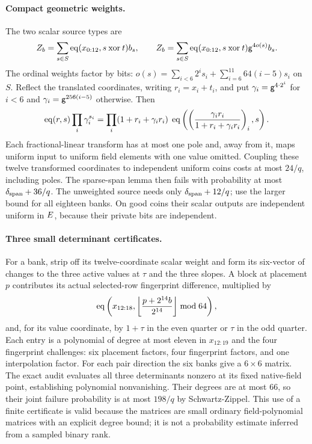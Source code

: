 \paragraph{Compact geometric weights.} The two scalar source types are
\[
 Z_b=\sum_{s\in S}\operatorname{eq}(x_{0:12},s\mathbin{\mathrm{xor}}t)b_s,
 \qquad
 Z_b=\sum_{s\in S}\operatorname{eq}(x_{0:12},s\mathbin{\mathrm{xor}}t)
                    \mathsf{g}^{4o(s)}b_s.
\]
The ordinal weights factor by bits: $o(s)=\sum_{i<6}2^is_i+\sum_{i=6}^{11}64(i-5)s_i$ on $S$. Reflect the translated coordinates, writing $r_i=x_i+t_i$, and put $\gamma_i=\mathsf{g}^{4\cdot2^i}$ for $i<6$ and $\gamma_i=\mathsf{g}^{256(i-5)}$ otherwise. Then
\[
 \operatorname{eq}(r,s)\prod_i\gamma_i^{s_i}
 =\prod_i(1+r_i+\gamma_i r_i)\;
   \operatorname{eq}\left(\left(\frac{\gamma_i r_i}{1+r_i+\gamma_i r_i}\right)_i,s\right).
\]
Each fractional-linear transform has at most one pole and, away from it, maps uniform input to uniform field elements with one value omitted. Coupling these twelve transformed coordinates to independent uniform coins costs at most $24/q$, including poles. The sparse-span lemma then fails with probability at most $\delta_{\rm span}+36/q$. The unweighted source needs only $\delta_{\rm span}+12/q$; use the larger bound for all eighteen banks. On good coins their scalar outputs are independent uniform in $E$, because their private bits are independent.

\paragraph{Three small determinant certificates.} For a bank, strip off its twelve-coordinate scalar weight and form its six-vector of changes to the three active values at $\tau$ and the three slopes. A block at placement $p$ contributes its actual selected-row fingerprint difference, multiplied by
\[
 \operatorname{eq}\left(x_{12:18},\left\lfloor
          \frac{p+2^{14}b}{2^{14}}\right\rfloor\bmod64\right),
\]
and, for its value coordinate, by $1+\tau$ in the even quarter or $\tau$ in the odd quarter. Each entry is a polynomial of degree at most eleven in $x_{12:19}$ and the four fingerprint challenges: six placement factors, four fingerprint factors, and one interpolation factor. For each pair direction the six banks give a $6\times6$ matrix. The exact audit evaluates all three determinants nonzero at its fixed native-field point, establishing polynomial nonvanishing. Their degrees are at most $66$, so their joint failure probability is at most $198/q$ by Schwartz-Zippel. This use of a finite certificate is valid because the matrices are small ordinary field-polynomial matrices with an explicit degree bound; it is not a probability estimate inferred from a sampled binary rank.


